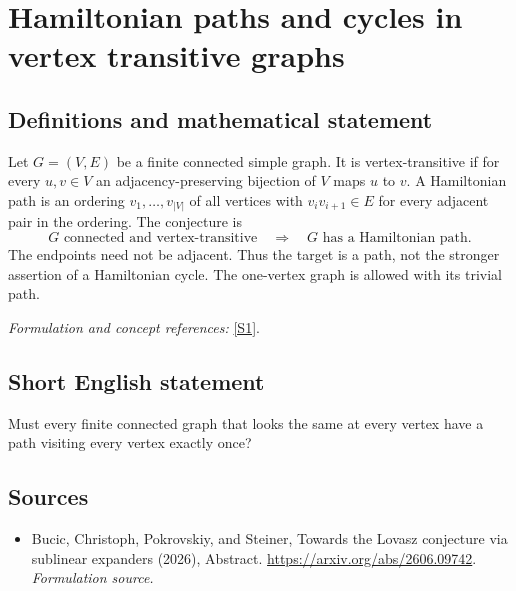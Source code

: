 \documentclass[11pt]{article}
\begin{document}
\section*{\texorpdfstring{Hamiltonian paths and cycles in vertex transitive graphs}{Hamiltonian paths and cycles in vertex transitive graphs}}\label{statement}
\subsection{Definitions and mathematical statement}
Let $G=(V,E)$ be a finite connected simple graph. It is vertex-transitive if for every $u,v\in V$ an adjacency-preserving bijection of $V$ maps $u$ to $v$. A Hamiltonian path is an ordering $v_1,\ldots,v_{|V|}$ of all vertices with $v_iv_{i+1}\in E$ for every adjacent pair in the ordering. The conjecture is
\[
 G\text{ connected and vertex-transitive}
 \quad\Longrightarrow\quad G\text{ has a Hamiltonian path}.
\]
The endpoints need not be adjacent. Thus the target is a path, not the stronger assertion of a Hamiltonian cycle. The one-vertex graph is allowed with its trivial path.
\par\smallskip\textit{Formulation and concept references:} \href{https://arxiv.org/abs/2606.09742}{[S1]}.

\subsection{Short English statement}
Must every finite connected graph that looks the same at every vertex have a path visiting every vertex exactly once?
\subsection{Sources}
\begin{itemize}
\item[S1]Bucic, Christoph, Pokrovskiy, and Steiner, Towards the Lovasz conjecture via sublinear expanders (2026), Abstract.
\url{https://arxiv.org/abs/2606.09742}.
\textit{Formulation source.}
\end{itemize}
\end{document}
